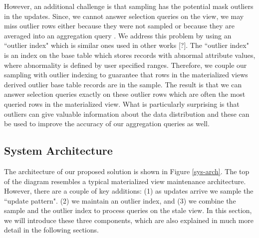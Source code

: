However, an additional challenge is that sampling has the potential mask outliers in the updates.
Since, we cannot answer selection queries on the view, we may miss outlier rows either because they were not sampled or because
they are averaged into an aggregation query .
We address this problem by using an ``outlier index" which is similar ones used in other works [?]. 
The ``outlier index" is an index on the base table which stores records with abnormal attribute values, where abnormality is defined by user specified ranges.
Therefore, we couple our sampling with outlier indexing to guarantee that rows in the materialized views derived outlier base table records are in the sample. 
The result is that we can answer selection queries exactly on these outlier rows which are often the most queried rows in the materialized view.
What is particularly surprising is that outliers can give valuable information about the data distribution and these can be used to improve the accuracy of our aggregation queries as well.

\subsection{System Architecture}
The architecture of our proposed solution is shown in Figure \ref{sys-arch}.
The top of the diagram resembles a typical materialized 
view maintenance architecture.
However, there are a couple of key additions: (1) as updates arrive we sample the ``update pattern". 
(2) we maintain an outlier index, and (3) we combine the sample and the outlier index to process queries on the stale view.
In this section, we will introduce these three components, which are also explained in much more detail in the following sections.

